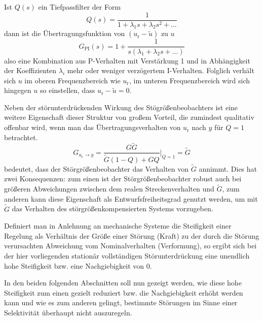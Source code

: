 Ist $Q(s)$ ein Tiefpassfilter der Form
\begin{equation}
Q(s)=\frac{1}{1 + \lambda_1 s + \lambda_2 s^2 + \hdots}
\end{equation}
dann ist die Übertragungsfunktion von $(u_\mathrm r{-}\tilde u)$ zu $u$
\begin{equation}
G_\mathrm{PI}(s)=1+\frac{1}{s(\lambda_1+\lambda_2 s + \hdots)}
\end{equation}
also eine Kombination aus P-Verhalten mit Verstärkung 1 und in Abhängigkeit der Koeffizienten
$\lambda_i$ mehr oder weniger verzögertem I-Verhalten. Folglich verhält sich $u$ im oberen Frequenzbereich wie $u_\mathrm{r}$, im unteren Frequenzbereich wird sich hingegen $u$ so einstellen, dass $u_\mathrm{r}-\tilde u=0$.

Neben der störunterdrückenden Wirkung des Stögrößenbeobachters ist eine weitere Eigenschaft dieser Struktur von großem Vorteil, die zumindest qualitativ offenbar wird, wenn man das Übertragungsverhalten von $u_\mathrm{r}$ nach $y$ für $Q=1$ betrachtet.
\begin{equation}
G_{u_\mathrm{r}\rightarrow y}=\frac{G\tilde G}{\tilde G(1-Q)+GQ}
\Biggr\rvert_{Q=1}=\tilde G\label{eq:DO3}
\end{equation}
 bedeutet, dass der Störgrößenbeobachter das Verhalten von $\tilde G$ annimmt. Dies hat zwei Konsequenzen: zum einen ist der Störgrößenbeobachter robust auch bei größeren Abweichungen zwischen dem realen Streckenverhalten und $\tilde G$, zum anderen kann diese Eigenschaft als Entwurfsfreiheitsgrad genutzt werden, um mit $\tilde G$ das Verhalten des störgrößenkompensierten Systems vorzugeben.

Definiert man in Anlehnung an mechanische Systeme die Steifigkeit einer Regelung als Verhältnis der Größe einer Störung (Kraft) zu der durch die Störung verursachten Abweichung vom Nominalverhalten (Verformung), so ergibt sich bei der hier vorliegenden stationär vollständigen Störunterdrückung eine unendlich hohe Steifigkeit bzw. eine Nachgiebigkeit von 0.



In den beiden folgenden Abschnitten soll nun gezeigt werden, wie diese hohe Steifigkeit zum einen gezielt reduziert bzw. die Nachgiebigkeit erhöht werden kann und wie es zum anderen gelingt, bestimmte Störungen im Sinne einer Selektivität überhaupt nicht auszuregeln.




